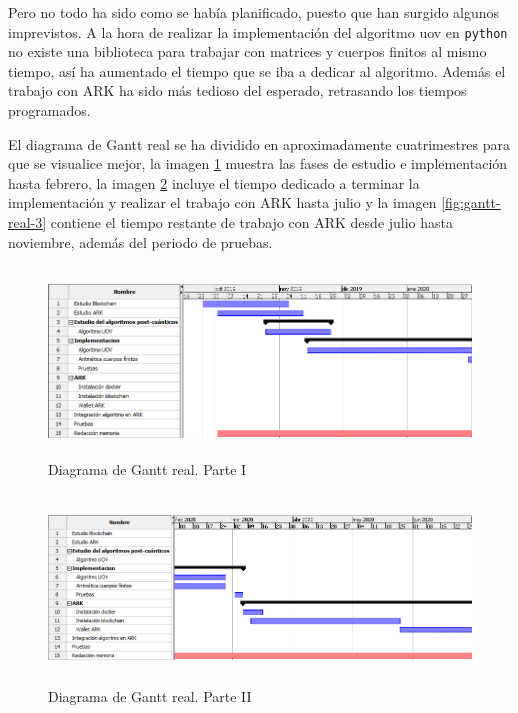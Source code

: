 Pero no todo ha sido como se había planificado, puesto que han surgido algunos imprevistos. A la hora de realizar la implementación del algoritmo \acrshort{uov} en \texttt{python} no existe una biblioteca para trabajar con matrices y cuerpos finitos al mismo tiempo, así ha aumentado el tiempo que se iba a dedicar al algoritmo. Además el trabajo con ARK ha sido más tedioso del esperado, retrasando los tiempos programados.

El diagrama de Gantt real se ha dividido en aproximadamente cuatrimestres para que se visualice mejor, la imagen \ref{fig:gantt-real-1} muestra las fases de estudio e implementación hasta febrero, la imagen \ref{fig:gantt-real-2} incluye el tiempo dedicado a terminar la implementación y realizar el trabajo con ARK hasta julio y la imagen \ref{fig:gantt-real-3} contiene el tiempo restante de trabajo con ARK desde julio hasta noviembre, además del periodo de pruebas.


\begin{figure}[h]
	\centering
	\includegraphics[width=13cm,height=5cm]{figuras/Gantt_1.png}
	\caption{Diagrama de Gantt real. Parte I}
	\label{fig:gantt-real-1}
\end{figure}

\begin{figure}[h]
	\centering
	\includegraphics[width=13cm,height=5cm]{figuras/Gantt_2.png}
	\caption{Diagrama de Gantt real. Parte II}
	\label{fig:gantt-real-2}
\end{figure}

